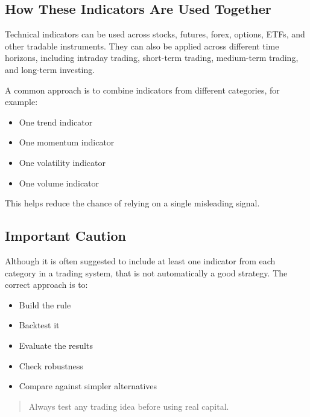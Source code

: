 \documentclass[12pt,openany]{book}
\begin{document}
\subsection{How These Indicators Are Used Together}
Technical indicators can be used across stocks, futures, forex, options, ETFs, and other tradable instruments. They can also be applied across different time horizons, including intraday trading, short-term trading, medium-term trading, and long-term investing.

A common approach is to combine indicators from different categories, for example:

\begin{itemize}[leftmargin=*]
    \item One trend indicator
    \item One momentum indicator
    \item One volatility indicator
    \item One volume indicator
\end{itemize}

This helps reduce the chance of relying on a single misleading signal.

\subsection{Important Caution}
Although it is often suggested to include at least one indicator from each category in a trading system, that is not automatically a good strategy. The correct approach is to:

\begin{itemize}[leftmargin=*]
    \item Build the rule
    \item Backtest it
    \item Evaluate the results
    \item Check robustness
    \item Compare against simpler alternatives
\end{itemize}

\begin{quote}
Always test any trading idea before using real capital.
\end{quote}
\end{document}
